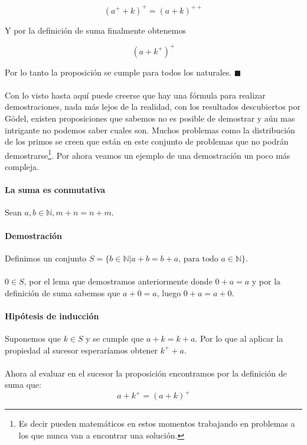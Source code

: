 \documentclass{article}
\begin{document}
$$(a^+ + k)^+ = (a + k)^{++}$$

Y por la definición de suma finalmente obtenemos

$$(a + k^+)^+$$

Por lo tanto la proposición se cumple para todos los naturales. $\blacksquare$

\paragraph{} Con lo visto hasta aquí puede creerse que hay una fórmula para realizar demostraciones, nada más lejos de la realidad, con los resultados descubiertos por Gödel, existen proposiciones que sabemos no es posible de demostrar y aún mas intrigante no podemos saber cuales son. Muchos problemas como la distribución de los primos se creen que están en este conjunto de problemas que no podrán demostrarse\footnote{Es decir pueden matemáticos en estos momentos trabajando en problemas a los que nunca van a encontrar una solución.}. Por ahora veamos un ejemplo de una demostración un poco más compleja.

\paragraph{La suma es conmutativa} Sean $a,b \in \mathbb{N}, m + n = n + m$.

\paragraph{Demostración} Definimos un conjunto $S = \{b \in \mathbb{N}|a + b = b + a\text{, para todo } a \in \mathbb{N}\}$.

\paragraph{} $0 \in S$, por el lema que demostramos anteriormente donde $0 + a = a$ y por la definición de suma sabemos que $a + 0 = a$, luego $0 + a = a + 0$.

\paragraph{Hipótesis de inducción} Suponemos que $k \in S$ y se cumple que $a + k = k + a$. Por lo que al aplicar la propiedad al sucesor esperaríamos obtener $k^+ + a$.

\paragraph{} Ahora al evaluar en el sucesor la proposición encontramos por la definición de suma que:
$$a + k^+ = (a + k)^+$$
\end{document}
